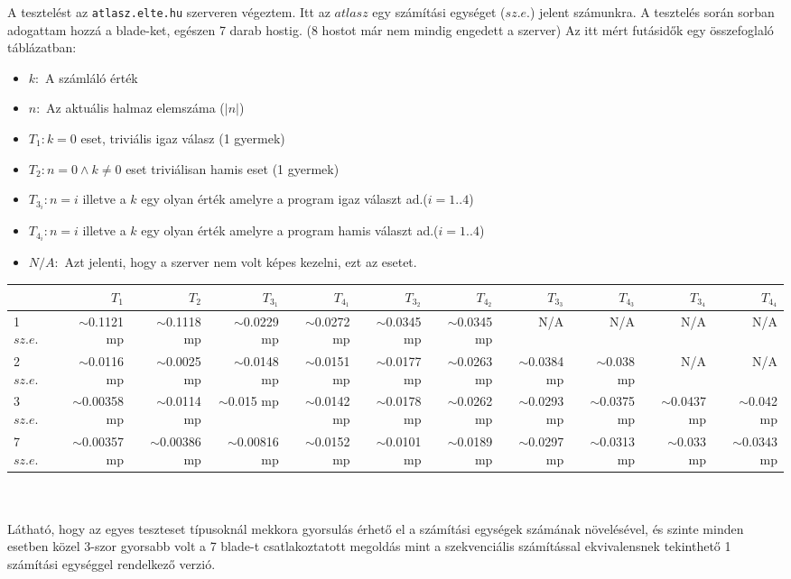 \documentclass[12pt]{article}
\begin{document}
A tesztelést az \verb|atlasz.elte.hu| szerveren végeztem. Itt az $atlasz$ egy számítási egységet ($sz.e.$) jelent számunkra.
A tesztelés során sorban adogattam hozzá a blade-ket, egészen 7 darab hostig. (8 hostot már nem mindig engedett a szerver)
Az itt mért futásidők egy összefoglaló táblázatban:

\begin{itemize}
	\item $k :$ A számláló érték
    \item $n :$ Az aktuális halmaz elemszáma ($|n|$)
    \item $T_1 : k = 0$ eset, triviális igaz válasz (1 gyermek)
    \item $T_2 : n = 0 \wedge k \neq 0$ eset triviálisan hamis eset (1 gyermek)
    \item $T_{3_i} : n = i$ illetve a $k$ egy olyan érték amelyre a program igaz választ ad.($i=1..4$)
    \item $T_{4_i} : n = i$ illetve a $k$ egy olyan érték amelyre a program hamis választ ad.($i=1..4$)
    \item $N/A :$ Azt jelenti, hogy a szerver nem volt képes kezelni, ezt az esetet.
\end{itemize}

\begin{adjustbox}{max width=\textwidth}
	\begin{tabular}{| l | r | r | r | r | r | r | r | r | r | r |}
      \hline
       & $T_1$ & $T_2$ & $T_{3_1}$ & $T_{4_1}$ & $T_{3_2}$ & $T_{4_2}$ & $T_{3_3}$ & $T_{4_3}$ & $T_{3_4}$ & $T_{4_4}$ \\ \hline
      1 $sz.e.$  & $\sim$0.1121 mp & $\sim$0.1118 mp & $\sim$0.0229 mp & $\sim$0.0272 mp & $\sim$0.0345 mp & $\sim$0.0345 mp & N/A & N/A & N/A & N/A  \\ \hline
      2 $sz.e.$ & $\sim$0.0116 mp & $\sim$0.0025 mp & $\sim$0.0148 mp & $\sim$0.0151 mp & $\sim$0.0177 mp & $\sim$0.0263 mp & $\sim$0.0384 mp & $\sim$0.038 mp & N/A & N/A \\ \hline
      3 $sz.e.$ & $\sim$0.00358 mp & $\sim$0.0114 mp & $\sim$0.015 mp & $\sim$0.0142 mp & $\sim$0.0178 mp & $\sim$0.0262 mp & $\sim$0.0293 mp & $\sim$0.0375 mp & $\sim$0.0437 mp & $\sim$0.042 mp \\ \hline
      7 $sz.e.$ & $\sim$0.00357 mp & $\sim$0.00386 mp & $\sim$0.00816 mp & $\sim$0.0152 mp & $\sim$0.0101 mp & $\sim$0.0189 mp & $\sim$0.0297 mp & $\sim$0.0313 mp & $\sim$0.033 mp & $\sim$0.0343 mp \\
      \hline
	\end{tabular}
\end{adjustbox}
\\
\\
Látható, hogy az egyes teszteset típusoknál mekkora gyorsulás érhető el a számítási egységek számának növelésével, és szinte minden esetben közel 3-szor gyorsabb volt a 7 blade-t csatlakoztatott megoldás mint a szekvenciális számítással ekvivalensnek tekinthető 1 számítási egységgel rendelkező verzió.
\end{document}
